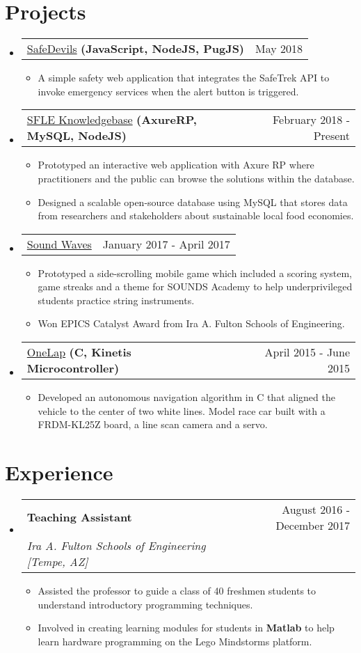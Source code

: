 \documentclass[letterpaper,11pt]{article}
\makeatletter
\newcommand{\sectionStart}{
  \begin{itemize}[label={},leftmargin=0in]
}
\newcommand{\sectionEnd}{
  \end{itemize}
}
\newcommand{\jobHeading}[3]{
  \vspace{-1pt}
  \item
  \begin{tabular*}{1.0\textwidth}{l@{\extracolsep{\fill}}r@{}}
    \normalsize{\textbf{#1}} & #2 \\
    \textit{\small#3} \\
  \end{tabular*}\vspace{-5pt}
}
\newcommand{\projectHeading}[4]{
  \vspace{-1pt}
  \item
  \begin{tabular*}{1.0\textwidth}{l@{\extracolsep{\fill}}r@{}}
    \normalsize{{\href{#1}{#2}} \textbf{#3}} & #4 \\
  \end{tabular*}\vspace{-5pt}
}
\newcommand{\listStart}{\begin{itemize}}
\newcommand{\listEnd}{\end{itemize}\vspace{-5pt}}
\newcommand{\bulletItem}[1]{
  \item
  \small{
    {#1 \vspace{-1.8pt}}
  }
}
\makeatother
\begin{document}
\section{Projects}
\sectionStart
  \projectHeading
    {http://testorangesafe.dickwyn.xyz/}
    {SafeDevils}
    {(JavaScript, NodeJS, PugJS)}
    {May 2018}
  \listStart
    \bulletItem
      {A simple safety web application that integrates the SafeTrek API to invoke emergency services when the alert button is triggered.}
  \listEnd
  \projectHeading
    {}
    {SFLE Knowledgebase}
    {(AxureRP, MySQL, NodeJS)}
    {February 2018 - Present}
  \listStart
    \bulletItem
      {Prototyped an interactive web application with Axure RP where practitioners and the public can browse the solutions within the database.}
    \bulletItem
      {Designed a scalable open-source database using MySQL that stores data from researchers and stakeholders about sustainable local food economies.}
  \listEnd
  \projectHeading
    {https://goo.gl/EsvFb6}
    {Sound Waves}
    {}
    {January 2017 - April 2017}
  \listStart
    \bulletItem
      {Prototyped a side-scrolling mobile game which included a scoring system, game streaks and a theme for SOUNDS Academy to help underprivileged students practice string instruments.}
    \bulletItem
      {Won EPICS Catalyst Award from Ira A. Fulton Schools of Engineering.}
  \listEnd
  \projectHeading
    {https://github.com/dickwyn/onelap}
    {OneLap}
    {(C, Kinetis Microcontroller)}
    {April 2015 - June 2015}
  \listStart
    \bulletItem
      {Developed an autonomous navigation algorithm in C that aligned the vehicle to the center of two white lines. Model race car built with a FRDM-KL25Z board, a line scan camera and a servo.}
  \listEnd
\sectionEnd
  
\section{Experience}
\sectionStart
  \jobHeading
    {Teaching Assistant}
    {August 2016 - December 2017}
    {Ira A. Fulton Schools of Engineering [Tempe, AZ]}
  \listStart
    \bulletItem
    {Assisted the professor to guide a class of 40 freshmen students to understand introductory programming techniques.}
    \bulletItem
    {Involved in creating learning modules for students in \textbf{Matlab} to help learn hardware programming on the Lego Mindstorms platform.}
  \listEnd
\sectionEnd

\end{document}

